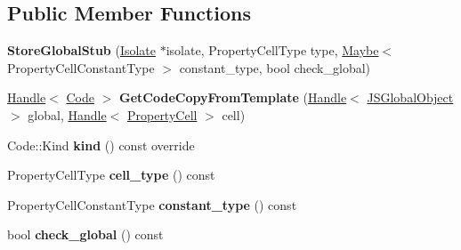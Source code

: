 \subsection*{Public Member Functions}
\begin{DoxyCompactItemize}
\item 
{\bfseries Store\+Global\+Stub} (\hyperlink{classv8_1_1internal_1_1_isolate}{Isolate} $\ast$isolate, Property\+Cell\+Type type, \hyperlink{classv8_1_1_maybe}{Maybe}$<$ Property\+Cell\+Constant\+Type $>$ constant\+\_\+type, bool check\+\_\+global)\hypertarget{classv8_1_1internal_1_1_store_global_stub_a918ca7ca3c95ed1303c8d774586c6001}{}\label{classv8_1_1internal_1_1_store_global_stub_a918ca7ca3c95ed1303c8d774586c6001}

\item 
\hyperlink{classv8_1_1internal_1_1_handle}{Handle}$<$ \hyperlink{classv8_1_1internal_1_1_code}{Code} $>$ {\bfseries Get\+Code\+Copy\+From\+Template} (\hyperlink{classv8_1_1internal_1_1_handle}{Handle}$<$ \hyperlink{classv8_1_1internal_1_1_j_s_global_object}{J\+S\+Global\+Object} $>$ global, \hyperlink{classv8_1_1internal_1_1_handle}{Handle}$<$ \hyperlink{classv8_1_1internal_1_1_property_cell}{Property\+Cell} $>$ cell)\hypertarget{classv8_1_1internal_1_1_store_global_stub_a11e5cf9b5384a109ef3402daa07f5ac1}{}\label{classv8_1_1internal_1_1_store_global_stub_a11e5cf9b5384a109ef3402daa07f5ac1}

\item 
Code\+::\+Kind {\bfseries kind} () const  override\hypertarget{classv8_1_1internal_1_1_store_global_stub_aab7141d684f016b94ca1763765452bc4}{}\label{classv8_1_1internal_1_1_store_global_stub_aab7141d684f016b94ca1763765452bc4}

\item 
Property\+Cell\+Type {\bfseries cell\+\_\+type} () const \hypertarget{classv8_1_1internal_1_1_store_global_stub_a09d8662707a354c2277ba37aabbff5ed}{}\label{classv8_1_1internal_1_1_store_global_stub_a09d8662707a354c2277ba37aabbff5ed}

\item 
Property\+Cell\+Constant\+Type {\bfseries constant\+\_\+type} () const \hypertarget{classv8_1_1internal_1_1_store_global_stub_a78b9f91a1fec17b8020b55bdf44ee9a9}{}\label{classv8_1_1internal_1_1_store_global_stub_a78b9f91a1fec17b8020b55bdf44ee9a9}

\item 
bool {\bfseries check\+\_\+global} () const \hypertarget{classv8_1_1internal_1_1_store_global_stub_a7d9c9d034bcc5d5ba93c0d4b2d1fdf45}{}\label{classv8_1_1internal_1_1_store_global_stub_a7d9c9d034bcc5d5ba93c0d4b2d1fdf45}


\end{DoxyCompactItemize}
